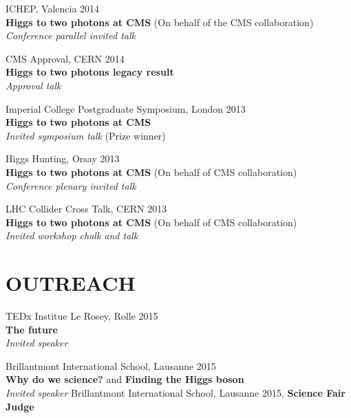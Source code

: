 \documentclass[margin, 10pt]{res} %
\begin{document}
\begin{resume}
ICHEP, Valencia 2014 \\
\textbf{Higgs to two photons at CMS} (On behalf of the CMS collaboration) \\
\textit{Conference parallel invited talk}

CMS Approval, CERN 2014 \\
\textbf{Higgs to two photons legacy result} \\
\textit{Approval talk}

Imperial College Postgraduate Symposium, London 2013\\
\textbf{Higgs to two photons at CMS} \\
\textit{Invited symposium talk} (Prize winner)

Higgs Hunting, Orsay 2013 \\
\textbf{Higgs to two photons at CMS} (On behalf of CMS collaboration) \\
\textit{Conference plenary invited talk}

LHC Collider Cross Talk, CERN 2013 \\
\textbf{Higgs to two photons at CMS} (On behalf of CMS collaboration) \\
\textit{Invited workshop chalk and talk}




\section{OUTREACH}

TEDx Institue Le Rosey, Rolle 2015 \\
\textbf{The future} \\
\textit{Invited speaker}

Brillantmont International School, Lausanne 2015 \\
\textbf{Why do we science?} and \textbf{Finding the Higgs boson} \\
\textit{Invited speaker}
Brillantmont International School, Lausanne 2015, \textbf{Science Fair Judge}


\end{resume}
\end{document}
